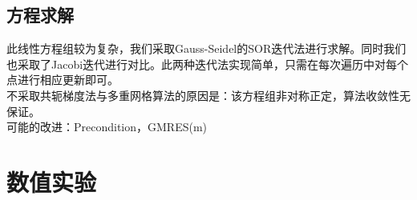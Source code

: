 \documentclass[11pt,a4 paper,one side]{article}
\begin{document}
\subsection{方程求解}
此线性方程组较为复杂，我们采取Gauss-Seidel的SOR迭代法进行求解。同时我们也采取了Jacobi迭代进行对比。此两种迭代法实现简单，只需在每次遍历中对每个点进行相应更新即可。
\\ 不采取共轭梯度法与多重网格算法的原因是：该方程组非对称正定，算法收敛性无保证。
\\ 可能的改进：Precondition，GMRES(m)
\section{数值实验}
\end{document}
